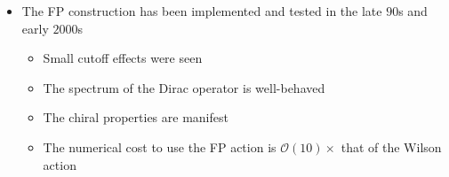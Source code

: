\begin{itemize}
    \item The FP construction has been implemented and tested in the late $90$s and early $2000$s
    \begin{itemize}
        \item Small cutoff effects were seen
        \item The spectrum of the Dirac operator is well-behaved
        \item The chiral properties are manifest
        \item The numerical cost to use the FP action is $\mathcal{O}(10)\times$ that of the Wilson action
    \end{itemize}
\end{itemize}
\begin{figure}
    \centering
    \label{fig:lambda}
\end{figure}
